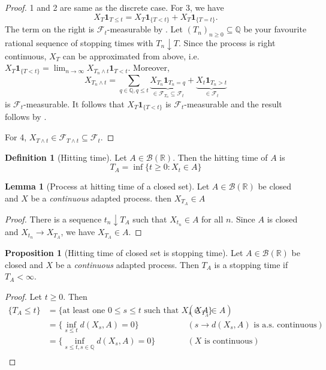 \documentclass[parskip=full]{article}
\theoremstyle{definition}
\newtheorem*{definition}{Definition}
\newtheorem{proposition}{Proposition}[section]
\newtheorem{lemma}{Lemma}[proposition]
\newcommand{\R}{\mathbb{R}}
\newcommand{\Q}{\mathbb{Q}}
\newcommand{\B}{\mathcal{B}}
\newcommand{\1}{\mathbbm{1}}
\begin{document}
\begin{proof}
  1 and 2 are same as the discrete case. For 3, we have
  \[
    X_T \mathbf{1}_{T \leq t} = X_T \mathbf{1}_{\{T < t\}} + X_T\mathbf{1}_{\{T = t\}}.
  \]
  The term on the right is $\mathcal{F}_t$-measurable by . Let $(T_n)_{n \geq 0} \subseteq \Q$ be your favourite rational sequence of stopping times with $T_n \downarrow T$. Since the process is right continuous, $X_T$ can be approximated from above, i.e. $X_T \mathbf{1}_{\{T < t\}} = \lim_{n \to \infty} X_{T_n \wedge t} \mathbf{1}_{T < t}$. Moreover,
    \[
      X_{T_n \wedge t} = \sum_{q \in \Q, q \leq t}\underbrace{X_{T_n} \mathbf{1}_{T_n = q}}_{\in \mathcal{F}_{T_n} \subseteq \mathcal{F}_t} + \underbrace{X_t \mathbf{1}_{T_n > t}}_{\in \mathcal{F}_t}
    \]
    is $\mathcal{F}_t$-measurable. It follows that $X_T \mathbf{1}_{\{T < t\}}$ is $\mathcal{F}_t$-measurable and the result follows by .

    For 4, $X_{T \wedge t} \in \mathcal{F}_{T \wedge t} \subseteq \mathcal{F}_t$.
\end{proof}

\begin{definition}[Hitting time]
  Let $A \in \B(\R)$. Then the hitting time of $A$ is
  \[
    T_A = \inf\{t \geq 0: X_t \in A\}
  \]
\end{definition}

\begin{lemma}[Process at hitting time of a closed set]
  Let $A \in \B(\R)$ be closed and $X$ be a \emph{continuous} adapted process. then $X_{T_A} \in A$ 
\end{lemma}

\begin{proof}
  There is a sequence $t_n \downarrow T_A$ such that $X_{t_n} \in A$ for all $n$. Since $A$ is closed and $X_{t_n} \to X_{T_A}$, we have $X_{T_A} \in A$.
\end{proof}

\begin{proposition}[Hitting time of closed set is stopping time]
  Let $A \in \B(\R)$ be closed and $X$ be a \emph{continuous} adapted process. Then $T_A$ is a stopping time if $T_A < \infty$.
\end{proposition}

\begin{proof}
  Let $t \geq 0$. Then
  \begin{align*}
    \{T_A \leq t\} &= \{\text{at least one $0 \leq s \leq t$ such that } X_s \in A\} && (X_{T_A} \in A)\\
    &= \{\inf_{s \leq t} d(X_s, A) = 0\} && (s \to d(X_s, A) \text{ is a.s. continuous})\\
    &= \{\inf_{s \leq t, s \in \Q} d(X_s, A) = 0\} && (X \text{ is continuous})\\
  \end{align*}
\end{proof}
\end{document}
